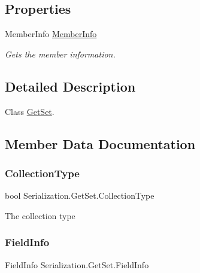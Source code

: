 \subsection*{Properties}
\begin{DoxyCompactItemize}
\item 
Member\+Info \hyperlink{class_serialization_1_1_get_set_a4a75edb3e7f3b72a0334cf9602adb2a5}{Member\+Info}
\begin{DoxyCompactList}\small\item\em Gets the member information. \end{DoxyCompactList}\end{DoxyCompactItemize}


\subsection{Detailed Description}
Class \hyperlink{class_serialization_1_1_get_set}{Get\+Set}. 



\subsection{Member Data Documentation}
\mbox{\label{class_serialization_1_1_get_set_ab18350c7fa05f210d1ca9906914792b9}} 
\subsubsection{\texorpdfstring{Collection\+Type}{CollectionType}}
{\footnotesize\ttfamily bool Serialization.\+Get\+Set.\+Collection\+Type}



The collection type 

\mbox{\label{class_serialization_1_1_get_set_a1023fc00dbf0857c5a41dbad0b791a8c}} 
\subsubsection{\texorpdfstring{Field\+Info}{FieldInfo}}
{\footnotesize\ttfamily Field\+Info Serialization.\+Get\+Set.\+Field\+Info}



